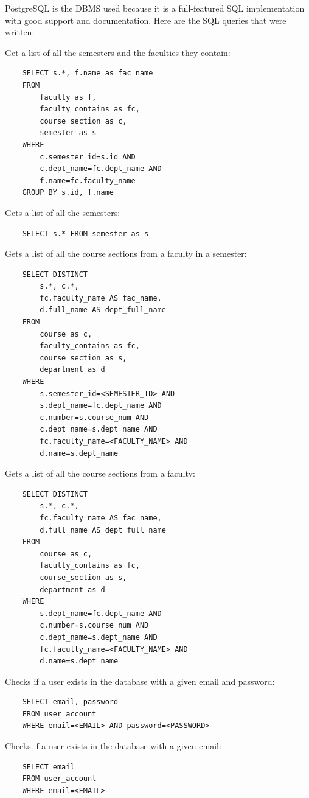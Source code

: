 \documentclass[twoside=false,a4paper,11pt]{article}
\theoremstyle{mytheor}
\begin{document}
PostgreSQL is the DBMS used because it is a full-featured SQL implementation with good support and documentation. Here are the SQL queries that were written:

Get a list of all the semesters and the faculties they contain:
\begin{lstlisting}
    SELECT s.*, f.name as fac_name
    FROM
        faculty as f,
        faculty_contains as fc,
        course_section as c,
        semester as s
    WHERE
        c.semester_id=s.id AND
        c.dept_name=fc.dept_name AND
        f.name=fc.faculty_name
    GROUP BY s.id, f.name
\end{lstlisting}

Gets a list of all the semesters:
\begin{lstlisting}
    SELECT s.* FROM semester as s
\end{lstlisting}

Gets a list of all the course sections from a faculty in a semester:
\begin{lstlisting}
    SELECT DISTINCT
        s.*, c.*,
        fc.faculty_name AS fac_name,
        d.full_name AS dept_full_name
    FROM
        course as c,
        faculty_contains as fc,
        course_section as s,
        department as d
    WHERE
        s.semester_id=<SEMESTER_ID> AND
        s.dept_name=fc.dept_name AND
        c.number=s.course_num AND
        c.dept_name=s.dept_name AND
        fc.faculty_name=<FACULTY_NAME> AND
        d.name=s.dept_name
\end{lstlisting}

Gets a list of all the course sections from a faculty:
\begin{lstlisting}
    SELECT DISTINCT
        s.*, c.*,
        fc.faculty_name AS fac_name,
        d.full_name AS dept_full_name
    FROM
        course as c,
        faculty_contains as fc,
        course_section as s,
        department as d
    WHERE
        s.dept_name=fc.dept_name AND
        c.number=s.course_num AND
        c.dept_name=s.dept_name AND
        fc.faculty_name=<FACULTY_NAME> AND
        d.name=s.dept_name
\end{lstlisting}

Checks if a user exists in the database with a given email and password:
\begin{lstlisting}
    SELECT email, password
    FROM user_account
    WHERE email=<EMAIL> AND password=<PASSWORD>
\end{lstlisting}

Checks if a user exists in the database with a given email:
\begin{lstlisting}
    SELECT email
    FROM user_account
    WHERE email=<EMAIL>
\end{lstlisting}
\end{document}
